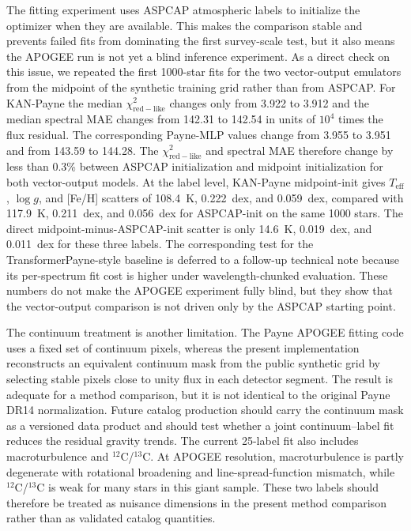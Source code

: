\documentclass[universe,article,submit,pdftex,moreauthors]{Definitions/mdpi}
\begin{document}
The fitting experiment uses ASPCAP atmospheric labels to initialize the
optimizer when they are available. This makes the comparison stable and
prevents failed fits from dominating the first survey-scale test, but it also
means the APOGEE run is not yet a blind inference experiment. As a direct
check on this issue, we repeated the first 1000-star fits for the two
vector-output emulators from the midpoint of the synthetic training grid rather
than from ASPCAP. For KAN-Payne the median
$\chi^2_{\mathrm{red-like}}$ changes only from 3.922 to 3.912 and the median
spectral MAE changes from 142.31 to 142.54 in units of $10^4$ times the flux
residual. The corresponding Payne-MLP values change from 3.955 to 3.951 and
from 143.59 to 144.28. The $\chi^2_{\mathrm{red-like}}$ and spectral MAE
therefore change by less than 0.3\% between ASPCAP initialization and midpoint
initialization for both vector-output models. At the label level, KAN-Payne
midpoint-init gives $T_{\mathrm{eff}}$, $\log g$, and [Fe/H] scatters of
108.4~K, 0.222~dex, and 0.059~dex, compared with 117.9~K, 0.211~dex, and
0.056~dex for ASPCAP-init on the same 1000 stars. The direct
midpoint-minus-ASPCAP-init scatter is only 14.6~K, 0.019~dex, and 0.011~dex
for these three labels. The corresponding test for the TransformerPayne-style
baseline is deferred to a follow-up technical note because its per-spectrum fit
cost is higher under wavelength-chunked evaluation. These numbers do not make
the APOGEE experiment fully blind, but they show that the vector-output
comparison is not driven only by the ASPCAP starting point.

The continuum treatment is another limitation. The Payne APOGEE fitting code
uses a fixed set of continuum pixels, whereas the present implementation
reconstructs an equivalent continuum mask from the public synthetic grid by
selecting stable pixels close to unity flux in each detector segment. The
result is adequate for a method comparison, but it is not identical to the
original Payne DR14 normalization. Future catalog production should carry the
continuum mask as a versioned data product and should test whether a joint
continuum--label fit reduces the residual gravity trends.
The current 25-label fit also includes macroturbulence and $^{12}$C/$^{13}$C.
At APOGEE resolution, macroturbulence is partly degenerate with rotational
broadening and line-spread-function mismatch, while $^{12}$C/$^{13}$C is weak
for many stars in this giant sample. These two labels should therefore be
treated as nuisance dimensions in the present method comparison rather than as
validated catalog quantities.
\end{document}
